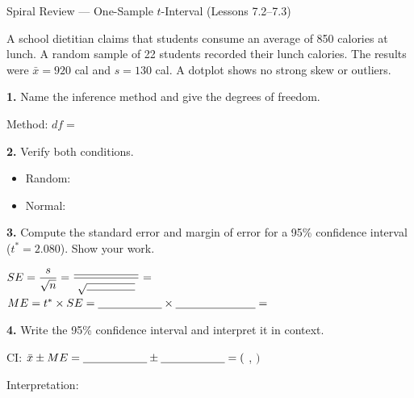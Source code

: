 \documentclass[10pt]{article}
\begin{document}
\namedateperiod

\vspace{0.15in}

\begin{notesbox}{Spiral Review --- One-Sample $t$-Interval (Lessons 7.2--7.3)}

A school dietitian claims that students consume an average of 850 calories at lunch. A
random sample of 22 students recorded their lunch calories. The results were
$\bar x = 920$ cal and $s = 130$ cal. A dotplot shows no strong skew or outliers.

\textbf{1.} Name the inference method and give the degrees of freedom.

\quad Method: \blank{6cm} \quad $df = $ \blank{1.5cm}

\textbf{2.} Verify both conditions.
\begin{itemize}
  \item Random: \writeline
  \item Normal: \writeline
\end{itemize}

\textbf{3.} Compute the standard error and margin of error for a 95\% confidence interval
($t^* = 2.080$). Show your work.

\vspace{0.1in}
$SE = \dfrac{s}{\sqrt{n}} = \dfrac{\blank{2cm}}{\sqrt{\blank{1.5cm}}} = $ \blank{2.5cm}
\hfill
$ME = t^* \times SE = \blank{2cm} \times \blank{2.5cm} = $ \blank{2.5cm}

\textbf{4.} Write the 95\% confidence interval and interpret it in context.

\quad CI: $\bar x \pm ME = \blank{2cm} \pm \blank{2cm} = ($ \blank{2cm} , \blank{2cm} $)$

\quad Interpretation: \writeline

\end{notesbox}
\end{document}
